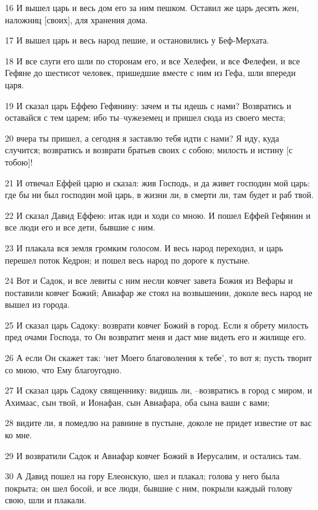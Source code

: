 \par 16 И вышел царь и весь дом его за ним пешком. Оставил же царь десять жен, наложниц [своих], для хранения дома.
\par 17 И вышел царь и весь народ пешие, и остановились у Беф-Мерхата.
\par 18 И все слуги его шли по сторонам его, и все Хелефеи, и все Фелефеи, и все Гефяне до шестисот человек, пришедшие вместе с ним из Гефа, шли впереди царя.
\par 19 И сказал царь Еффею Гефянину: зачем и ты идешь с нами? Возвратись и оставайся с тем царем; ибо ты--чужеземец и пришел сюда из своего места;
\par 20 вчера ты пришел, а сегодня я заставлю тебя идти с нами? Я иду, куда случится; возвратись и возврати братьев своих с собою; милость и истину [с тобою]!
\par 21 И отвечал Еффей царю и сказал: жив Господь, и да живет господин мой царь: где бы ни был господин мой царь, в жизни ли, в смерти ли, там будет и раб твой.
\par 22 И сказал Давид Еффею: итак иди и ходи со мною. И пошел Еффей Гефянин и все люди его и все дети, бывшие с ним.
\par 23 И плакала вся земля громким голосом. И весь народ переходил, и царь перешел поток Кедрон; и пошел весь народ по дороге к пустыне.
\par 24 Вот и Садок, и все левиты с ним несли ковчег завета Божия из Вефары и поставили ковчег Божий; Авиафар же стоял на возвышении, доколе весь народ не вышел из города.
\par 25 И сказал царь Садоку: возврати ковчег Божий в город. Если я обрету милость пред очами Господа, то Он возвратит меня и даст мне видеть его и жилище его.
\par 26 А если Он скажет так: `нет Моего благоволения к тебе', то вот я; пусть творит со мною, что Ему благоугодно.
\par 27 И сказал царь Садоку священнику: видишь ли, --возвратись в город с миром, и Ахимаас, сын твой, и Ионафан, сын Авиафара, оба сына ваши с вами;
\par 28 видите ли, я помедлю на равнине в пустыне, доколе не придет известие от вас ко мне.
\par 29 И возвратили Садок и Авиафар ковчег Божий в Иерусалим, и остались там.
\par 30 А Давид пошел на гору Елеонскую, шел и плакал; голова у него была покрыта; он шел босой, и все люди, бывшие с ним, покрыли каждый голову свою, шли и плакали.
